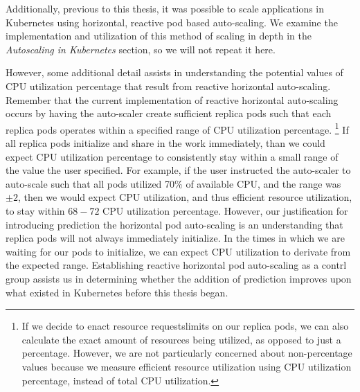 Additionally, previous to this thesis, it was possible to scale applications in
Kubernetes using horizontal, reactive pod based auto-scaling. We examine the implementation
and utilization of this method of scaling in depth in the \textit{Autoscaling in
Kubernetes} section, so we will not repeat it here.

However, some additional detail assists in understanding the potential values of
CPU utilization percentage that result from reactive horizontal auto-scaling.
Remember that the current implementation of reactive horizontal auto-scaling
occurs by having the auto-scaler create sufficient replica pods such that each
replica pods operates within a specified range of CPU utilization percentage.
\footnote{If we decide to enact resource requests\/limits on our replica pods, we can also
calculate the exact amount of resources being utilized, as opposed to just a
percentage. However, we are not particularly concerned about non-percentage
values because we measure efficient resource utilization using CPU utilization
percentage, instead of total CPU utilization.} If all replica pods initialize
and share in the work immediately, than we could expect CPU utilization
percentage to consistently stay within a small range of the value the user
specified. For example, if the user instructed the auto-scaler to auto-scale
such that all pods utilized 70\% of available CPU, and the range was $\pm 2$,
then we would expect CPU utilization, and thus efficient resource utilization,
to stay within $68 - 72$ CPU utilization percentage.
However, our justification for introducing prediction
the horizontal pod auto-scaling is an understanding that replica pods will not
always immediately initialize. In the times in which we are waiting for our pods
to initialize, we can expect CPU utilization to derivate from the expected
range. Establishing reactive horizontal pod auto-scaling as a contrl group
assists us in determining whether the addition of prediction improves upon what
existed in Kubernetes before this thesis began.
